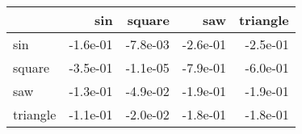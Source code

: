 \begin{tabular}{lrrrr}
\toprule
{} &      sin &   square &      saw &  triangle \\
\midrule
sin      & -1.6e-01 & -7.8e-03 & -2.6e-01 &  -2.5e-01 \\
square   & -3.5e-01 & -1.1e-05 & -7.9e-01 &  -6.0e-01 \\
saw      & -1.3e-01 & -4.9e-02 & -1.9e-01 &  -1.9e-01 \\
triangle & -1.1e-01 & -2.0e-02 & -1.8e-01 &  -1.8e-01 \\
\bottomrule
\end{tabular}

